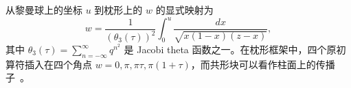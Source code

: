 从黎曼球上的坐标 $u$ 到枕形上的 $w$ 的显式映射为
\begin{equation}\label{eq:3-26}
  w=\frac{1}{(\theta_3(\tau))^2}\int_0^u\frac{dx}{\sqrt{x(1-x)(z-x)}},
\end{equation}
其中 $\theta_3(\tau)=\sum_{n=-\infty}^{\infty}q^{n^2}$ 是 Jacobi theta 函数之一。在枕形框架中，四个原初算符插入在四个角点 $w=0,\pi,\pi\tau,\pi(1+\tau)$，而共形块可以看作柱面上的传播子~\cite{r11}。


